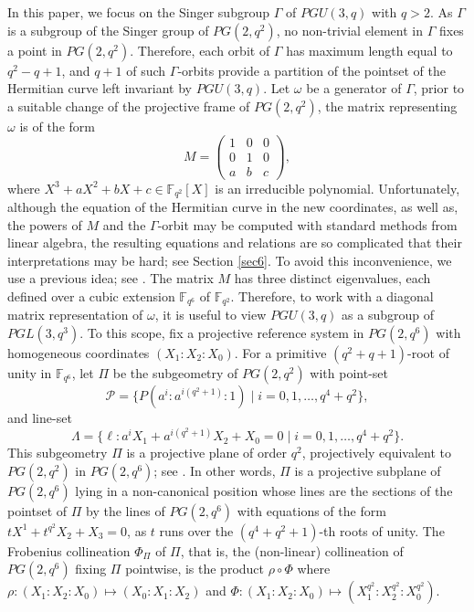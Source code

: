 \documentclass[9pt]{article}
\theoremstyle{plain}
\begin{document}
In this paper, we focus on the Singer subgroup $\Gamma$ of $PGU(3,q)$ with $q>2$. As $\Gamma$ is a subgroup of the Singer group of $PG(2,q^2)$, no non-trivial element in $\Gamma$ fixes a point in $PG(2,q^2)$. Therefore, each orbit of $\Gamma$ has maximum length equal to $q^2-q+1$, and $q+1$ of such $\Gamma$-orbits provide a partition of the pointset of the Hermitian curve left invariant by $PGU(3,q)$. Let $\omega$ be a generator of $\Gamma$, prior to a suitable change of the projective frame of $PG(2,q^2)$, the matrix representing $\omega$ is of the form
\[M=\left(\begin{array}{ccc}
1 & 0 & 0\\
0 & 1& 0\\
a &b& c
\end{array}\right),\]
where $X^3+aX^2+bX+c\in\mathbb F_{q^2}[X]$ is an irreducible polynomial. Unfortunately, although the equation of the Hermitian curve in the new coordinates, as well as, the powers of $M$ and the $\Gamma$-orbit may be computed with standard methods from linear algebra, the resulting equations and relations are so complicated that their interpretations may be hard; see Section \ref{sec6}. To avoid this inconvenience, we use a previous idea; see \cite{CK1998,CK1997,CKT}. The matrix $M$ has three distinct eigenvalues, each defined over a cubic extension $\mathbb{F}_{q^6}$ of $\mathbb{F}_{q^2}$. Therefore, to work with a diagonal matrix representation of $\omega$, it is useful to view $PGU(3,q)$ as a subgroup of $PGL(3,q^3)$.
To this scope, fix a projective reference system in $PG(2,q^6)$ with homogeneous coordinates $(X_1:X_2:X_0)$. For a primitive $(q^2+q+1)$-root of unity in $\mathbb{F}_{q^6}$, let $\Pi$ be the subgeometry of $PG(2,q^2)$ with point-set
\[\mathcal{P}=\{P(a^i:a^{i(q^2+1)}:1)\mid i=0,1,\ldots,q^4+q^2\},\] and  line-set
{{\small}\[\Lambda=\{\ell: a^iX_1+a^{i(q^2+1)}X_2+X_0=0 \mid i=0,1,\ldots,q^4+q^2\}.\]}
This subgeometry $\Pi$ is a projective plane of order $q^2$, projectively equivalent to $PG(2,q^2)$ in $PG(2,q^6)$; see \cite{CK1997,CK1998,CKT}. In other words, $\Pi$ is a projective subplane of $PG(2,q^6)$ lying in a non-canonical position whose lines are the sections of the pointset of $\Pi$  by the lines of $PG(2,q^6)$ with equations of the form $tX^1+ t^{q^2}X_2+X_3=0$, as $t$ runs over the $(q^4+q^2+1)$-th roots of unity. The Frobenius collineation $\Phi_{\Pi}$ of $\Pi$, that is, the (non-linear) collineation of $PG(2,q^6)$ fixing $\Pi$ pointwise, is the product $\rho\circ \Phi$ where $\rho:(X_1:X_2:X_0)\mapsto (X_0:X_1:X_2)$ and $\Phi:(X_1:X_2:X_0)\mapsto (X_1^{q^2}:X_2^{q^2}:X_0^{q^2})$.     
\end{document}
